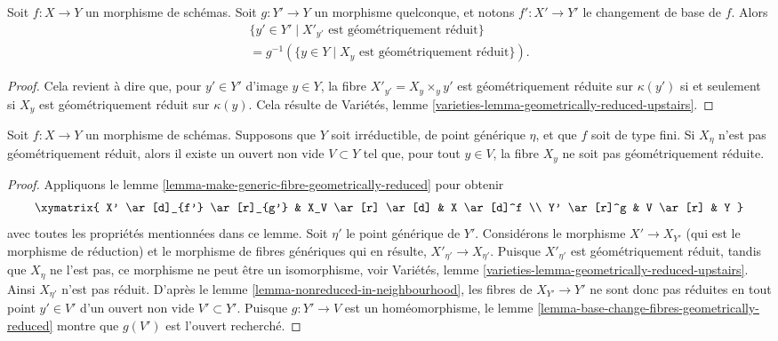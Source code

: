 \begin{lemma}
\label{lemma-base-change-fibres-geometrically-reduced}
Soit $f : X \to Y$ un morphisme de schémas.
Soit $g : Y' \to Y$ un morphisme quelconque, et notons
$f' : X' \to Y'$ le changement de base de $f$.
Alors
\begin{align*}
\{y' \in Y' \mid X'_{y'}\text{ est géométriquement réduit}\} \\
= g^{-1}(\{y \in Y \mid X_y\text{ est géométriquement réduit}\}).
\end{align*}
\end{lemma}

\begin{proof}
Cela revient à dire que, pour $y' \in Y'$ d'image
$y \in Y$, la fibre $X'_{y'} = X_y \times_y y'$ est géométriquement
réduite sur $\kappa(y')$ si et seulement si $X_y$ est géométriquement
réduit sur $\kappa(y)$. Cela résulte de
Variétés, lemme \ref{varieties-lemma-geometrically-reduced-upstairs}.
\end{proof}

\begin{lemma}
\label{lemma-not-geometrically-reduced-in-neighbourhood}
Soit $f : X \to Y$ un morphisme de schémas. Supposons que $Y$ soit irréductible, de
point générique $\eta$, et que $f$ soit de type fini. Si $X_\eta$ n'est pas
géométriquement réduit, alors il existe un ouvert non vide $V \subset Y$
tel que, pour tout $y \in V$, la fibre $X_y$ ne soit pas géométriquement réduite.
\end{lemma}

\begin{proof}
Appliquons le
lemme \ref{lemma-make-generic-fibre-geometrically-reduced}
pour obtenir
$$
\xymatrix{
X' \ar[d]_{f'} \ar[r]_{g'} & X_V \ar[r] \ar[d] & X \ar[d]^f \\
Y' \ar[r]^g & V \ar[r] & Y
}
$$
avec toutes les propriétés mentionnées dans ce lemme.
Soit $\eta'$ le point générique de $Y'$.
Considérons le morphisme $X' \to X_{Y'}$ (qui est le morphisme de
réduction) et le morphisme de fibres génériques qui en résulte,
$X'_{\eta'} \to X_{\eta'}$.
Puisque $X'_{\eta'}$ est géométriquement réduit, tandis que $X_\eta$
ne l'est pas, ce morphisme ne peut être un isomorphisme, voir
Variétés, lemme \ref{varieties-lemma-geometrically-reduced-upstairs}.
Ainsi $X_{\eta'}$ n'est pas réduit. D'après le
lemme \ref{lemma-nonreduced-in-neighbourhood},
les fibres de $X_{Y'} \to Y'$ ne sont donc pas réduites en tout point $y' \in V'$
d'un ouvert non vide $V' \subset Y'$. Puisque $g : Y' \to V$ est un homéomorphisme, le
lemme \ref{lemma-base-change-fibres-geometrically-reduced}
montre que $g(V')$ est l'ouvert recherché.
\end{proof}

